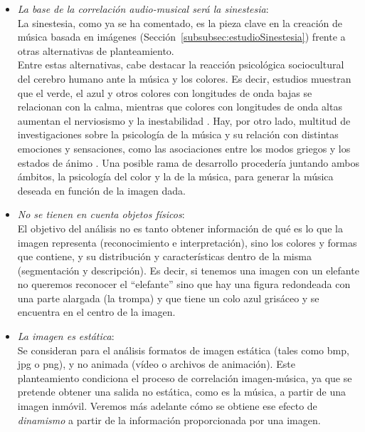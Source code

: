 		\begin{itemize}
		
		\item \emph{La base de la correlación audio-musical será la sinestesia}:
			\vspace{0.1in}
			\\La sinestesia, como ya se ha comentado, es la pieza clave en la creación de música basada en imágenes (Sección~\ref{subsubsec:estudioSinestesia}) frente a otras alternativas de planteamiento.\\
			Entre estas alternativas, cabe destacar la reacción psicológica sociocultural del cerebro humano ante la música y los colores. Es decir, estudios muestran que el verde, el azul y otros colores con longitudes de onda bajas se relacionan con la calma, mientras que colores con longitudes de onda altas aumentan el nerviosismo y la inestabilidad \cite{colorpsy}. Hay, por otro lado, multitud de investigaciones sobre la psicología de la música y su relación con distintas emociones y sensaciones, como las asociaciones entre los modos griegos y los estados de ánimo \cite{micrologus}. Una posible rama de desarrollo procedería juntando ambos ámbitos, la psicología del color y la de la música, para generar la música deseada en función de la imagen dada.\\
		\item \emph{No se tienen en cuenta objetos físicos}:
			\vspace{0.1in}
			\\El objetivo del análisis no es tanto obtener información de qué es lo que la imagen representa (reconocimiento e interpretación), sino los colores y formas que contiene, y su distribución y características dentro de la misma (segmentación y descripción). Es decir, si tenemos una imagen con un elefante no queremos reconocer el ``elefante'' sino que hay una figura  redondeada con una parte alargada (la trompa) y que tiene un colo azul grisáceo y se encuentra en el centro de la imagen.
		\item \emph{La imagen es estática}:
			\vspace{0.1in}
			\\Se consideran para el análisis formatos de imagen estática (tales como bmp, jpg o png), y no animada (vídeo o archivos de animación). Este planteamiento condiciona el proceso de correlación imagen-música, ya que se pretende obtener una salida no estática, como es la música, a partir de una imagen inmóvil. Veremos más adelante cómo se obtiene ese efecto de \emph{dinamismo} a partir de la información proporcionada por una imagen.

\end{itemize}
